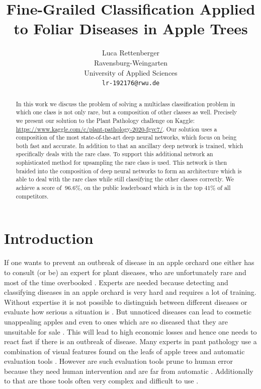 \documentclass[10pt,twocolumn,letterpaper]{article}
\begin{document}
\title{Fine-Grailed Classification Applied to Foliar Diseases in Apple Trees}

\author{Luca Rettenberger\\
Ravensburg-Weingarten \\ 
University of Applied Sciences \\
{\tt\small lr-192176@rwu.de}
}

\maketitle

\begin{abstract}
In this work we discuss the problem of solving a multiclass classification problem in which one class is not only rare, but a composition of other classes as well. Precisely we present our solution to the Plant Pathology challenge on Kaggle: \url{https://www.kaggle.com/c/plant-pathology-2020-fgvc7/}. Our solution uses a composition of the most state-of-the-art deep neural networks, which focus on being both fast and accurate.  In addition to that an ancillary deep network is trained, which specifically deals with the rare class. To support this additional network an sophisticated method for upsampling the rare class is used. This network is then braided into the composition of deep neural networks to form an architecture which is able to deal with the rare class while still classifying the other classes correctly. We achieve a score of             $\ 96.6\%$,  on the public leaderboard which is in the top $41\%$ of all competitors.
\end{abstract}

\section{Introduction}
If one wants to prevent an outbreak of disease in an apple orchard one either has to consult (or be) an expert for plant diseases, who are unfortunately rare and most of the time overbooked \cite{judd2017development, thapa2020plant}. Experts are needed because detecting and classifying diseases in an apple orchard is very hard and requires a lot of training. Without expertise it is not possible to distinguish between different diseases or evaluate how serious a situation is \cite{thapa2020plant}. But unnoticed diseases can lead to cosmetic unappealing apples and even to ones which are so diseased that they are unsuitable for sale \cite{sutton2014compendium}. This will lead to high economic losses and hence one needs to react fast if there is an outbreak of disease. Many experts in pant pathology use a combination of visual features found on the leafs of apple trees and automatic evaluation tools \cite{barbedo2014automatic}. However are such evaluation tools prune to human error because they need human intervention and are far from automatic  \cite{barbedo2014automatic}. Additionally to that are those tools often very complex and difficult to use  \cite{barbedo2014automatic}.
\end{document}
